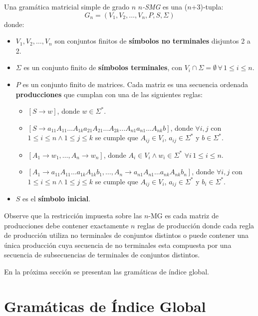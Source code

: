 Una gramática matricial simple de grado $n$ \textit{$n$-SMG} es una ($n$+3)-tupla:
$$
      G_n=(V_1,V_2,\ldots,V_n,P,S,\Sigma)
$$
donde:
\begin{itemize}
      \item \( V_1, V_2, \ldots, V_n \) son conjuntos finitos de \textbf{símbolos no terminales} disjuntos 2 a 2.
      \item \( \Sigma \) es un conjunto finito de \textbf{símbolos terminales}, con \( V_i \cap \Sigma = \emptyset\,\forall\,1\leq i\leq n \).
      \item \( P \) es un conjunto finito de matrices. Cada matriz es una secuencia ordenada \textbf{producciones} que cumplan con una de las siguientes reglas:
            \begin{itemize}
                  \item $[S\to w]$, donde $w\in \Sigma ^*$.
                  \item $[S\to a_{11}A_{11}\ldots A_{1k}a_{21}A_{21}\ldots A_{2k}\ldots A_{n1}a_{n1}\ldots A_{nk}b]$,
                        donde $\forall i,j$ con $1\leq i\leq n\wedge 1\leq j\leq k$ se cumple que
                        $A_{ij}\in V_i$, $a_{ij}\in \Sigma ^*$ y $b\in \Sigma ^*$.
                  \item $[A_1\to w_1,\ldots, A_n\to w_n]$, donde $A_i\in V_i\wedge w_i\in \Sigma ^*$ $\forall i\, 1\leq i\leq n$.
                  \item $[A_1 \to a_{11}A_{11}\ldots a_{1k}A_{1k}b_1,\ldots,A_n \to a_{n1}A_{n1}\ldots a_{nk}A_{nk}b_n]$, donde $\forall i,j$
                        con $1\leq i\leq n\wedge 1\leq j\leq k$ se cumple que
                        $A_{ij}\in V_i$, $a_{ij}\in \Sigma ^*$ y $b_{i}\in \Sigma ^*$.
            \end{itemize}
      \item \( S \) es el \textbf{símbolo inicial}.
\end{itemize}


Observe que la restricción impuesta sobre las $n$-MG es cada matriz de producciones debe contener exactamente $n$ reglas de producción
donde cada regla de producción utiliza no terminales de conjuntos distintos o puede contener una única producción cuya secuencia de no terminales
esta compuesta por una secuencia de subsecuencias de terminales de conjuntos distintos.

En la próxima sección se presentan las gramáticas de índice global.
\section{Gramáticas de Índice Global}

